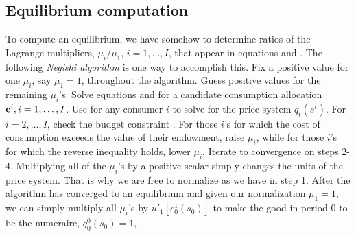 %


\subsection{Equilibrium computation}\label{sec:Negishi}%
To compute an equilibrium, we have somehow to determine ratios of
the Lagrange multipliers, $\mu_i / \mu_1$, $i=1, \ldots, I $,
that appear in equations  and .  The following {\it
Negishi algorithm\/} is one way to accomplish this.
\medskip
{}  Fix a positive value for one $\mu_i$, say $\mu_1=1$,
throughout the algorithm.  Guess  positive values for the
remaining  $\mu_i$'s. 
\medskip
{}  
Solve  equations  and  for
a candidate consumption allocation ${\bf c}^i, i=1, \ldots, I$.
\medskip
{}  Use  for any consumer $i$ to solve for the
price system $q_t(s^t)$.
\medskip
{}  For $i =2, \ldots, I$, check the budget constraint
.  For those $i$'s for which the cost of consumption
exceeds the value of their endowment, raise $\mu_i$, while for
those $i$'s for which the reverse inequality holds, lower $\mu_i$.
\medskip {} Iterate to convergence on steps 2-4.
\medskip
\noindent Multiplying all of the $\mu_i$'s by a positive scalar
simply  changes the units of the price system. That is why we
are free to normalize as we have in step 1. After the
algorithm has converged to an equilibrium and given our
normalization $\mu_1=1$, we can simply multiply all
$\mu_i$'s by  $u'_1[c_0^1(s_0)]$ to make the good in
period 0 to be the numeraire, $q^0_0(s_0)= 1$,

